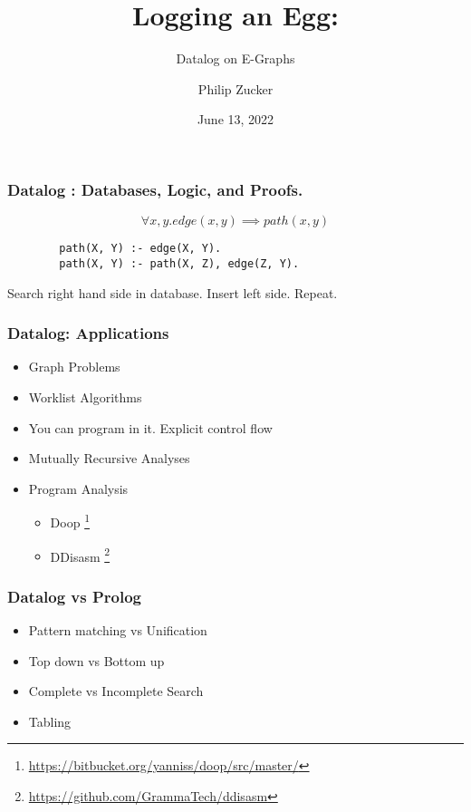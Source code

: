 \documentclass{beamer}
\title{Logging an Egg:}
\subtitle{Datalog on E-Graphs}
\author{Philip Zucker}
\institute{Draper Laboratory}
\date{June 13, 2022}
\begin{document}
\frame{\titlepage}


\begin{frame}[fragile]
\frametitle{Datalog : Databases, Logic, and Proofs.}

  $$\forall x,y. edge(x,y) \implies path(x,y)$$
   \begin{prooftree}
        \end{prooftree}
\begin{lstlisting}
        path(X, Y) :- edge(X, Y).
        path(X, Y) :- path(X, Z), edge(Z, Y).
        \end{lstlisting} 
        Search right hand side in database. Insert left side. Repeat.
\end{frame}

\begin{frame}
    \frametitle{Datalog: Applications}
    
    \begin{itemize}
        \item Graph Problems %
        \item Worklist Algorithms
        \item You can program in it. Explicit control flow
        \item Mutually Recursive Analyses
        \item Program Analysis %
            \begin{itemize}
                \item Doop \footnote{\url{https://bitbucket.org/yanniss/doop/src/master/}}
                \item DDisasm \footnote{\url{https://github.com/GrammaTech/ddisasm}}
            \end{itemize}
    \end{itemize}
\end{frame}


\begin{frame}
    \frametitle{Datalog vs Prolog}
    \begin{itemize}
        \item Pattern matching vs Unification
        \item Top down vs Bottom up
        \item Complete vs Incomplete Search
        \item Tabling
    \end{itemize}
\end{frame}
\end{document}
